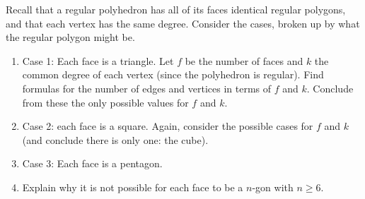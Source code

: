 \documentclass{book}
\begin{document}
\setcounter{cpjt}{35}
\addtocounter{cpjt}{-1}
\begin{activity}\label{activity-30}
\hypertarget{p-318}{}%
Recall that a regular polyhedron has all of its faces identical regular polygons, and that each vertex has the same degree. Consider the cases, broken up by what the regular polygon might be.%
\begin{enumerate}[font=\bfseries,label=(\alph*),ref=\alph*]
\item\label{task-44} \hypertarget{p-319}{}%
Case 1: Each face is a triangle.  Let \(f\) be the number of faces and \(k\) the common degree of each vertex (since the polyhedron is regular).  Find formulas for the number of edges and vertices in terms of \(f\) and \(k\).  Conclude from these the only possible values for \(f\) and \(k\).%
\par\smallskip%
\noindent\item\label{task-45} \hypertarget{p-322}{}%
Case 2: each face is a square.  Again, consider the possible cases for \(f\) and \(k\) (and conclude there is only one: the cube).%
\par\smallskip%
\noindent\item\label{task-46} \hypertarget{p-326}{}%
Case 3: Each face is a pentagon.%
\par\smallskip%
\noindent\item\label{task-47} \hypertarget{p-329}{}%
Explain why it is not possible for each face to be a \(n\)-gon with \(n \ge 6\).%
\par\smallskip%
\noindent\end{enumerate}
\end{activity}

\clearpage
\end{document}
